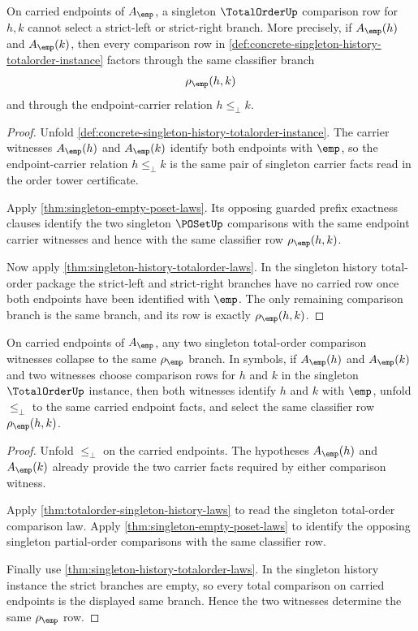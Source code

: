 \begin{theorem}
\label{thm:totalorder-singleton-strict-branch-exclusion}
On carried endpoints of $A_{\emp}$, a singleton $\TotalOrderUp$ comparison row
for $h,k$ cannot select a strict-left or strict-right branch. More precisely,
if $A_{\emp}(h)$ and $A_{\emp}(k)$, then every comparison row in
\autoref{def:concrete-singleton-history-totalorder-instance} factors through
the same classifier branch
$$
\rho_{\emp}(h,k)
$$
and through the endpoint-carrier relation $h\le_{\bot}k$.
\end{theorem}
\begin{proof}
Unfold \autoref{def:concrete-singleton-history-totalorder-instance}. The
carrier witnesses $A_{\emp}(h)$ and $A_{\emp}(k)$ identify both endpoints with
$\emp$, so the endpoint-carrier relation $h\le_{\bot}k$ is the same pair of
singleton carrier facts read in the order tower certificate.

Apply \autoref{thm:singleton-empty-poset-laws}. Its opposing guarded prefix
exactness clauses identify the two singleton $\POSetUp$ comparisons with the
same endpoint carrier witnesses and hence with the same classifier row
$\rho_{\emp}(h,k)$.

Now apply \autoref{thm:singleton-history-totalorder-laws}. In the singleton
history total-order package the strict-left and strict-right branches have no
carried row once both endpoints have been identified with $\emp$. The only
remaining comparison branch is the same branch, and its row is exactly
$\rho_{\emp}(h,k)$.
\end{proof}

\begin{theorem}
\label{thm:totalorder-singleton-comparison-determinacy}
On carried endpoints of $A_{\emp}$, any two singleton total-order comparison
witnesses collapse to the same $\rho_{\emp}$ branch. In symbols, if
$A_{\emp}(h)$ and $A_{\emp}(k)$ and two witnesses choose comparison rows for
$h$ and $k$ in the singleton $\TotalOrderUp$ instance, then both witnesses
identify $h$ and $k$ with $\emp$, unfold $\le_{\bot}$ to the same carried
endpoint facts, and select the same classifier row $\rho_{\emp}(h,k)$.
\end{theorem}
\begin{proof}
Unfold $\le_{\bot}$ on the carried endpoints. The hypotheses
$A_{\emp}(h)$ and $A_{\emp}(k)$ already provide the two carrier facts required
by either comparison witness.

Apply \autoref{thm:totalorder-singleton-history-laws} to read the singleton
total-order comparison law. Apply
\autoref{thm:singleton-empty-poset-laws} to identify the opposing singleton
partial-order comparisons with the same classifier row.

Finally use \autoref{thm:singleton-history-totalorder-laws}. In the singleton
history instance the strict branches are empty, so every total comparison on
carried endpoints is the displayed same branch. Hence the two witnesses
determine the same $\rho_{\emp}$ row.
\end{proof}

